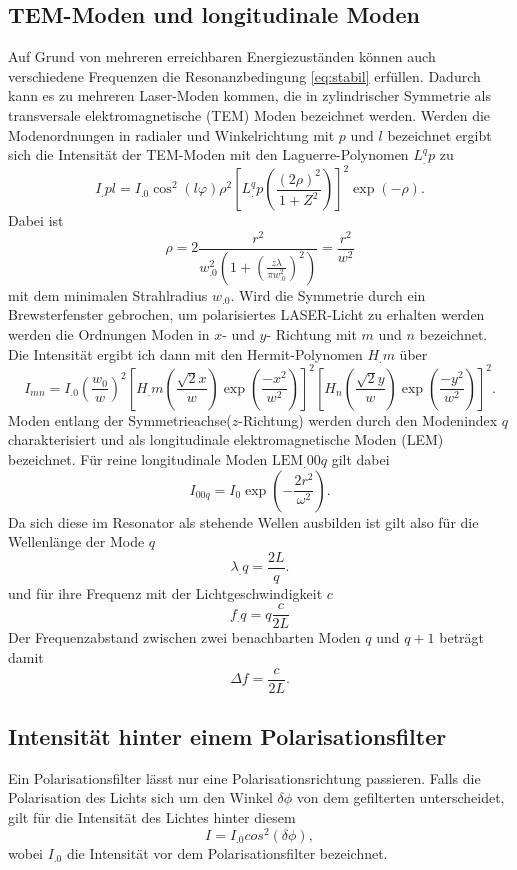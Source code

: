 \subsection{TEM-Moden und longitudinale Moden}
Auf Grund von mehreren erreichbaren Energiezuständen können auch verschiedene Frequenzen die Resonanzbedingung \eqref{eq:stabil} erfüllen. Dadurch kann es zu mehreren Laser-Moden kommen, die in zylindrischer Symmetrie als transversale elektromagnetische (TEM) Moden bezeichnet werden.
Werden die Modenordnungen in radialer und Winkelrichtung  mit $p$ und $l$ bezeichnet ergibt sich die Intensität der TEM-Moden mit den Laguerre-Polynomen $L^q_.p$ zu
\begin{equation}
I_.{pl} = I_.0 \cos^2 (l \varphi) \rho^2 \left[L^q_.{p}\left(\frac{(2 \rho)^2}{1+Z^2} \right)\right] ^2 \exp\left(-\rho \right)\text{.} \label{eq:intens}
\end{equation}
Dabei ist
\[
\rho = 2 \frac{r^2}{w^2_.0 \left(1+\left(\frac{z \lambda}{\pi w_.0^2}\right)^2\right)} = \frac{r^2}{w^2}
\]
mit dem minimalen Strahlradius $w_.0$.
Wird die Symmetrie durch ein Brewsterfenster gebrochen, um polarisiertes LASER-Licht zu erhalten werden werden die Ordnungen Moden in $x$- und $y$- Richtung mit $m$ und $n$ bezeichnet.
Die Intensität ergibt ich dann mit den Hermit-Polynomen $H_.m$ über
\begin{equation}
I_{mn} = I_.0 \left(\frac{w_0}{w}\right)^2 \left[H_.m\left(\frac{\sqrt{2} x}{w}\right) \exp\left(\frac{-x^2}{w^2}\right) \right]^2 \left[H_n\left(\frac{\sqrt{2} y}{w}\right) \exp\left(\frac{-y^2}{w^2}\right) \right]^2\text{.}
\label{eq:intens2}
\end{equation}
Moden entlang der Symmetrieachse($z$-Richtung) werden durch den Modenindex $q$ charakterisiert und als longitudinale elektromagnetische Moden (LEM) bezeichnet. Für reine longitudinale Moden $\text{LEM}_.{00q}$ gilt dabei
\begin{equation}
I_{00q} = I_0 \exp\left(-\frac{2 r^2}{\omega ^2}\right)\text{.} \label{eq:gaus}
\end{equation}
Da sich diese im Resonator als stehende Wellen ausbilden ist gilt also für die Wellenlänge der Mode $q$
\[
\lambda_.q = \frac{2L}{q}\text{.}
\]
und für ihre Frequenz mit der Lichtgeschwindigkeit $c$
\[
f_.q = q\frac{c}{2L}
\]
Der Frequenzabstand zwischen zwei benachbarten Moden $q$ und $q+1$ beträgt damit
\[
\Delta f = \frac{c}{2L}\text{.}
\]


\subsection{Intensität hinter einem Polarisationsfilter}
Ein Polarisationsfilter lässt nur eine Polarisationsrichtung passieren. Falls die Polarisation des Lichts sich um den Winkel $\delta\phi$ von dem gefilterten unterscheidet, gilt für die Intensität des Lichtes hinter diesem
\begin{equation}
	I=I_.0 cos^2(\delta\phi), \label{eq:polar}
\end{equation}
wobei $I_.0$ die Intensität vor dem Polarisationsfilter bezeichnet.



